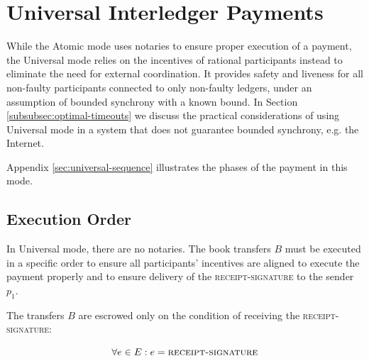 \documentclass[letterpaper,twocolumn,10pt]{article}
\begin{document}
\section{Universal Interledger Payments}
\label{sec:universal}


While the Atomic mode uses notaries to ensure proper execution of a payment, the Universal mode relies on the incentives of rational participants instead to eliminate the need for external coordination. It provides safety and liveness for all non-faulty participants connected to only non-faulty ledgers, under an assumption of bounded synchrony with a known bound. In Section \ref{subsubsec:optimal-timeouts} we discuss the practical considerations of using Universal mode in a system that does not guarantee bounded synchrony, e.g. the Internet.

Appendix \ref{sec:universal-sequence} illustrates the phases of the payment in this mode.


\subsection{Execution Order}


In Universal mode, there are no notaries. The book transfers $B$ must be executed in a specific order to ensure all participants' incentives are aligned to execute the payment properly and to ensure delivery of the \textsc{receipt-signature} to the sender $p_1$.

The transfers $B$ are escrowed only on the condition of receiving the \textsc{receipt-signature}:

\begin{equation}
\forall e \in E : e = \textsc{receipt-signature}
\end{equation}
\end{document}
